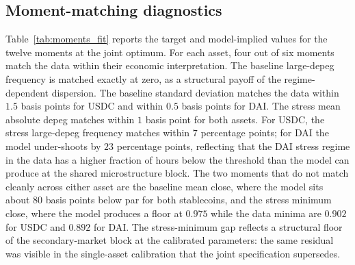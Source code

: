 \subsection{Moment-matching diagnostics}\label{sub:moments_fit}

Table~\ref{tab:moments_fit} reports the target and model-implied values for the twelve moments at the joint optimum. For each asset, four out of six moments match the data within their economic interpretation. The baseline large-depeg frequency is matched exactly at zero, as a structural payoff of the regime-dependent dispersion. The baseline standard deviation matches the data within $1.5$ basis points for USDC and within $0.5$ basis points for DAI. The stress mean absolute depeg matches within $1$ basis point for both assets. For USDC, the stress large-depeg frequency matches within $7$ percentage points; for DAI the model under-shoots by $23$ percentage points, reflecting that the DAI stress regime in the data has a higher fraction of hours below the threshold than the model can produce at the shared microstructure block. The two moments that do not match cleanly across either asset are the baseline mean close, where the model sits about $80$ basis points below par for both stablecoins, and the stress minimum close, where the model produces a floor at $0.975$ while the data minima are $0.902$ for USDC and $0.892$ for DAI. The stress-minimum gap reflects a structural floor of the secondary-market block at the calibrated parameters: the same residual was visible in the single-asset calibration that the joint specification supersedes.

